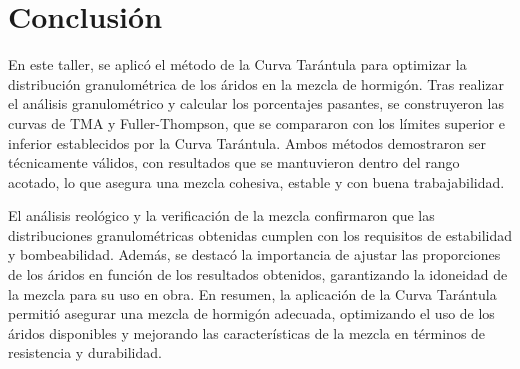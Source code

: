 \section{Conclusión}

En este taller, se aplicó el método de la Curva Tarántula para optimizar la distribución granulométrica de los áridos en la mezcla de hormigón. Tras realizar el análisis granulométrico y calcular los porcentajes pasantes, se construyeron las curvas de TMA y Fuller-Thompson, que se compararon con los límites superior e inferior establecidos por la Curva Tarántula. Ambos métodos demostraron ser técnicamente válidos, con resultados que se mantuvieron dentro del rango acotado, lo que asegura una mezcla cohesiva, estable y con buena trabajabilidad.

El análisis reológico y la verificación de la mezcla confirmaron que las distribuciones granulométricas obtenidas cumplen con los requisitos de estabilidad y bombeabilidad. Además, se destacó la importancia de ajustar las proporciones de los áridos en función de los resultados obtenidos, garantizando la idoneidad de la mezcla para su uso en obra. En resumen, la aplicación de la Curva Tarántula permitió asegurar una mezcla de hormigón adecuada, optimizando el uso de los áridos disponibles y mejorando las características de la mezcla en términos de resistencia y durabilidad.
